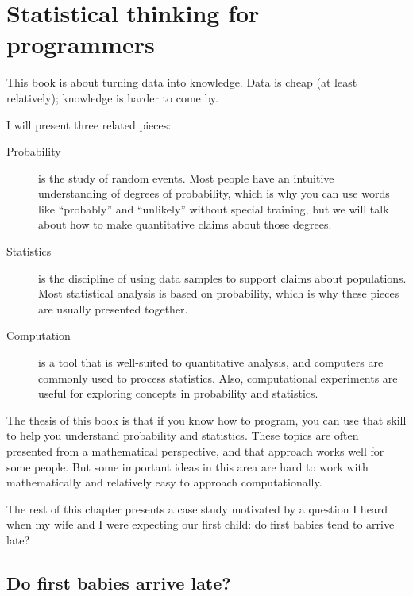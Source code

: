 \documentclass[12pt]{book}
\begin{document}
\chapter{Statistical thinking for programmers}
\label{intro}

This book is about turning data into knowledge.  Data is cheap (at
least relatively); knowledge is harder to come by.

I will present three related pieces:

\begin{description}

\item[Probability] is the study of random events.  Most people have an
  intuitive understanding of degrees of probability, which is why you
  can use words like ``probably'' and ``unlikely'' without special
  training, but we will talk about how to make quantitative claims
  about those degrees.


\item[Statistics] is the discipline of using data samples to support
  claims about populations.  Most statistical analysis is based on
  probability, which is why these pieces are usually presented
  together.


\item[Computation] is a tool that is well-suited to quantitative
  analysis, and computers are commonly used to process statistics.
  Also, computational experiments
  are useful for exploring concepts in probability and statistics.


\end{description}

The thesis of this book is that if you know how to program, you can
use that skill to help you understand probability and statistics.
These topics are often presented from a mathematical perspective, and
that approach works well for some people.  But some important ideas
in this area are hard to work with mathematically and relatively
easy to approach computationally.

The rest of this chapter presents a case study motivated by a question
I heard when my wife and I were expecting our first child: do first
babies tend to arrive late?


\section{Do first babies arrive late?}
\end{document}
